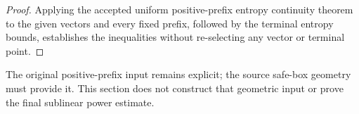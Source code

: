 \begin{proof}
    \leanok
    Applying the accepted uniform positive-prefix entropy continuity theorem to
    the given vectors and every fixed prefix, followed by the terminal
    entropy bounds, establishes the inequalities without re-selecting any
    vector or terminal point.
\end{proof}

The original positive-prefix input remains explicit; the source safe-box
geometry must provide it.  This section does not construct that geometric
input or prove the final sublinear power estimate.
